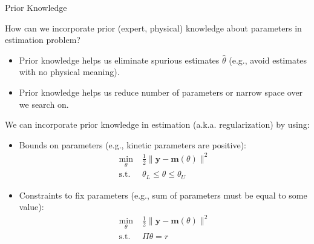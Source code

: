 \documentclass[handout,9pt]{beamer}
\begin{document}
%
\begin{frame}{Prior Knowledge}

\begin{block}{}
How can we incorporate prior (expert, physical) knowledge about parameters in  estimation problem? 
\end{block}
\begin{itemize}
\setlength{\itemsep}{5pt}
\item Prior knowledge helps us eliminate spurious estimates $\hat{\theta}$ (e.g., avoid estimates with no physical meaning). 
\item Prior knowledge helps us reduce number of parameters or narrow space over we search on.
\end{itemize}
We can incorporate prior knowledge in estimation (a.k.a. regularization) by using: 
\begin{itemize}
\item Bounds on parameters (e.g., kinetic parameters are positive):
\begin{align*}
\min_{\theta}& \; \frac{1}{2}\|\mathbf{y}- \mathbf{m}(\theta)\|^2\\ 
\textrm{s.t.}&\; \theta_L\leq \theta\leq\theta_U 
\end{align*}
\item Constraints to fix parameters (e.g., sum of parameters must be equal to some value):
\begin{align*}
\min_{\theta}& \; \frac{1}{2}\|\mathbf{y}- \mathbf{m}(\theta)\|^2\\ 
\textrm{s.t.}&\; \Pi \theta = r
\end{align*}

\end{itemize}
\end{frame}
\end{document}

